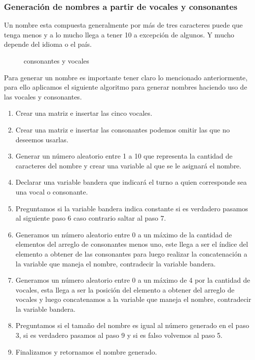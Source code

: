 \subsubsection{Generaci\'on de nombres a partir de vocales y consonantes}
Un nombre esta compuesta generalmente por m\'as de tres caracteres puede que tenga menos y a lo mucho llega a tener 10 a excepci\'on de algunos. Y mucho depende del idioma o el pa\'is.
\begin{figure}[H]
\centering
{}
\caption{consonantes y vocales} \label{fig:consonantes y vocales}
\end{figure}
Para generar un nombre es importante tener claro lo mencionado anteriormente, para ello aplicamos el siguiente algoritmo para generar nombres haciendo uso de las vocales y consonantes.
\begin{enumerate}
\item Crear una matriz e insertar las cinco vocales.
\item Crear una matriz e insertar las consonantes podemos omitir las que no deseemos usarlas.
\item Generar un n\'umero aleatorio entre 1 a 10 que representa la cantidad de caracteres del nombre y crear una variable al que se le asignar\'a el nombre.
\item Declarar una variable bandera que indicar\'a el turno a quien corresponde sea una vocal o consonante.
\item Preguntamos si la variable bandera indica constante si es verdadero pasamos al siguiente paso 6 caso contrario saltar al paso 7.
\item Generamos un n\'umero aleatorio entre 0 a un m\'aximo de la cantidad de elementos del arreglo de consonantes menos uno, este llega a ser el \'indice del elemento a obtener de las consonantes para luego realizar la concatenaci\'on a la variable que maneja el nombre, contradecir la variable bandera.
\item Generamos un n\'umero aleatorio entre 0 a un m\'aximo de 4 por la cantidad de vocales, esta llega a ser la posici\'on del elemento a obtener del arreglo de vocales y luego concatenamos a la variable que maneja el nombre, contradecir la variable bandera.
\item Preguntamos si el tama\~no del nombre es igual al n\'umero generado en el paso 3, si es verdadero pasamos al paso 9 y si es falso volvemos al paso 5.
\item Finalizamos y retornamos el nombre generado. 
\end{enumerate}

